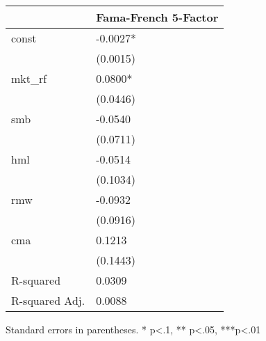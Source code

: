 \begin{table}
\caption{}
\label{}
\begin{center}
\begin{tabular}{ll}
\hline
               & Fama-French 5-Factor  \\
\hline
const          & -0.0027*              \\
               & (0.0015)              \\
mkt\_rf        & 0.0800*               \\
               & (0.0446)              \\
smb            & -0.0540               \\
               & (0.0711)              \\
hml            & -0.0514               \\
               & (0.1034)              \\
rmw            & -0.0932               \\
               & (0.0916)              \\
cma            & 0.1213                \\
               & (0.1443)              \\
R-squared      & 0.0309                \\
R-squared Adj. & 0.0088                \\
\hline
\end{tabular}
\end{center}
\end{table}
\bigskip
Standard errors in parentheses. \newline 
* p<.1, ** p<.05, ***p<.01